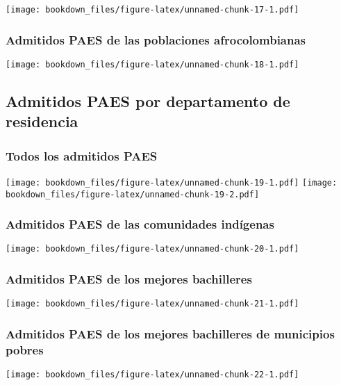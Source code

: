 \documentclass[]{article}
\theoremstyle{definition}
\theoremstyle{definition}
\theoremstyle{definition}
\theoremstyle{remark}
\begin{document}
\texttt{[image: bookdown\_files/figure-latex/unnamed-chunk-17-1.pdf]}

\subsubsection{Admitidos PAES de las poblaciones
afrocolombianas}\label{admitidos-paes-de-las-poblaciones-afrocolombianas}

\texttt{[image: bookdown\_files/figure-latex/unnamed-chunk-18-1.pdf]}

\subsection{Admitidos PAES por departamento de
residencia}\label{admitidos-paes-por-departamento-de-residencia}

\subsubsection{Todos los admitidos
PAES}\label{todos-los-admitidos-paes-1}

\texttt{[image: bookdown\_files/figure-latex/unnamed-chunk-19-1.pdf]}
\texttt{[image: bookdown\_files/figure-latex/unnamed-chunk-19-2.pdf]}

\subsubsection{Admitidos PAES de las comunidades
indígenas}\label{admitidos-paes-de-las-comunidades-indigenas-1}

\texttt{[image: bookdown\_files/figure-latex/unnamed-chunk-20-1.pdf]}

\subsubsection{Admitidos PAES de los mejores
bachilleres}\label{admitidos-paes-de-los-mejores-bachilleres-1}

\texttt{[image: bookdown\_files/figure-latex/unnamed-chunk-21-1.pdf]}

\subsubsection{Admitidos PAES de los mejores bachilleres de municipios
pobres}\label{admitidos-paes-de-los-mejores-bachilleres-de-municipios-pobres-1}

\texttt{[image: bookdown\_files/figure-latex/unnamed-chunk-22-1.pdf]}
\end{document}
